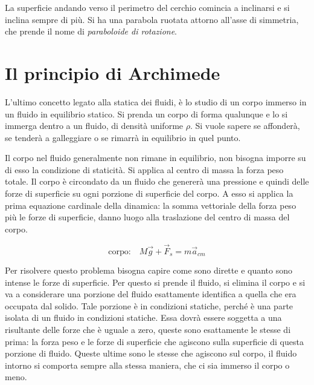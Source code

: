 \begin{figure}[htpb]
\end{figure}
\FloatBarrier
La superficie andando verso il perimetro del cerchio comincia a inclinarsi e si inclina sempre di più. Si ha una parabola ruotata attorno all'asse di simmetria, che prende il nome di \emph{paraboloide di rotazione}.

\section{Il principio di Archimede}

L'ultimo concetto legato alla statica dei fluidi, è lo studio di un corpo immerso in un fluido in equilibrio statico. Si prenda un corpo di forma qualunque e lo si immerga dentro a un fluido, di densità uniforme $\rho$. Si vuole sapere se affonderà, se tenderà a galleggiare o se rimarrà in equilibrio in quel punto.

Il corpo nel fluido generalmente non rimane in equilibrio, non bisogna imporre su di esso la condizione di staticità. Si applica al centro di massa la forza peso totale. Il corpo è circondato da un fluido che genererà una pressione e quindi delle forze di superficie su ogni porzione di superficie del corpo. A esso si applica la prima equazione cardinale della dinamica: la somma vettoriale della forza peso più le forze di superficie, danno luogo alla traslazione del centro di massa del corpo.

\[
	\text{corpo:} \quad M\vec{g} + \vec{F}_s = m\vec{a}_{cm}
\]

Per risolvere questo problema bisogna capire come sono dirette e quanto sono intense le forze di superficie. Per questo si prende il fluido, si elimina il corpo e si va a considerare una porzione del fluido esattamente identifica a quella che era occupata dal solido. Tale porzione è in condizioni statiche, perché è una parte isolata di un fluido in condizioni statiche. Essa dovrà essere soggetta a una risultante delle forze che è uguale a zero, queste sono esattamente le stesse di prima: la forza peso e le forze di superficie che agiscono sulla superficie di questa porzione di fluido. Queste ultime sono le stesse che agiscono sul corpo, il fluido intorno si comporta sempre alla stessa maniera, che ci sia immerso il corpo o meno.

